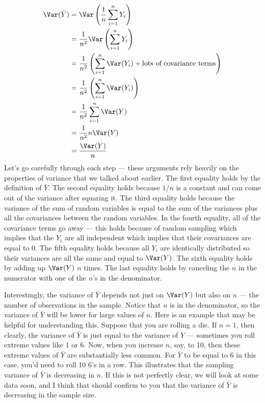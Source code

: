 \documentclass[
  letterpaper,
  DIV=11,
  numbers=noendperiod]{scrreprt}
\begin{document}
\[
  \begin{aligned}
    \Var(\bar{Y}) &= \Var\left(\frac{1}{n} \sum_{i=1}^n Y_i\right) \\
    &= \frac{1}{n^2} \Var\left(\sum_{i=1}^n Y_i\right) \\
    &= \frac{1}{n^2} \left( \sum_{i=1}^n \Var(Y_i) + \textrm{lots of covariance terms} \right) \\
    &= \frac{1}{n^2} \left( \sum_{i=1}^n \Var(Y_i) \right) \\
    &= \frac{1}{n^2} \sum_{i=1}^n \Var(Y) \\
    &= \frac{1}{n^2} n \Var(Y) \\
    &= \frac{\Var(Y)}{n}
  \end{aligned}
\] Let's go carefully through each step --- these arguments rely heavily
on the properties of variance that we talked about earlier. The first
equality holds by the definition of \(\bar{Y}\). The second equality
holds because \(1/n\) is a constant and can come out of the variance
after squaring it. The third equality holds because the variance of the
sum of random variables is equal to the sum of the variances plus all
the covariances between the random variables. In the fourth equality,
all of the covariance terms go away --- this holds because of random
sampling which implies that the \(Y_i\) are all independent which
implies that their covariances are equal to 0. The fifth equality holds
because all \(Y_i\) are identically distributed so their variances are
all the same and equal to \(\Var(Y)\). The sixth equality holds by
adding up \(\Var(Y)\) \(n\) times. The last equality holds by canceling
the \(n\) in the numerator with one of the \(n\)'s in the denominator.

Interestingly, the variance of \(\bar{Y}\) depends not just on
\(\Var(Y)\) but also on \(n\) --- the number of observations in the
sample. Notice that \(n\) is in the denominator, so the variance of
\(\bar{Y}\) will be lower for large values of \(n\). Here is an example
that may be helpful for understanding this. Suppose that you are rolling
a die. If \(n=1\), then clearly, the variance of \(\bar{Y}\) is just
equal to the variance of \(Y\) --- sometimes you roll extreme values
like \(1\) or \(6\). Now, when you increase \(n\), say, to 10, then
these extreme values of \(\bar{Y}\) are substantially less common. For
\(\bar{Y}\) to be equal to \(6\) in this case, you'd need to roll 10
\(6\)'s in a row. This illustrates that the sampling variance of
\(\bar{Y}\) is decreasing in \(n\). If this is not perfectly clear, we
will look at some data soon, and I think that should confirm to you that
the variance of \(\bar{Y}\) is decreasing in the sample size.
\end{document}
